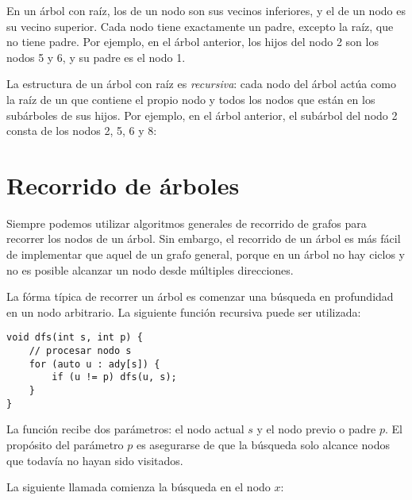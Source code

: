 En un árbol con raíz, los  de un nodo
son sus vecinos inferiores, y el  de un nodo
es su vecino superior.
Cada nodo tiene exactamente un padre,
excepto la raíz, que no tiene padre.
Por ejemplo, en el árbol anterior,
los hijos del nodo 2 son los nodos 5 y 6,
y su padre es el nodo 1.


La estructura de un árbol con raíz es \emph{recursiva}:
cada nodo del árbol actúa como la raíz de un 
que contiene el propio nodo y todos los nodos
que están en los subárboles de sus hijos.
Por ejemplo, en el árbol anterior, el subárbol del nodo 2
consta de los nodos 2, 5, 6 y 8:
\begin{center}
\end{center}

\section{Recorrido de árboles}

Siempre podemos utilizar algoritmos generales de recorrido de grafos
para recorrer los nodos de un árbol. Sin embargo, el recorrido
de un árbol es más fácil de implementar que aquel de un grafo general,
porque en un árbol no hay ciclos y no es posible alcanzar un nodo
desde múltiples direcciones.

La fórma típica de recorrer un árbol es comenzar una búsqueda en
profundidad en un nodo arbitrario. La siguiente función recursiva
puede ser utilizada:

\begin{lstlisting}
void dfs(int s, int p) {
    // procesar nodo s
    for (auto u : ady[s]) {
        if (u != p) dfs(u, s);
    }
}
\end{lstlisting}

La función recibe dos parámetros: el nodo actual $s$ y el nodo
previo o padre $p$. El propósito del parámetro $p$ es asegurarse de que
la búsqueda solo alcance nodos que todavía no hayan sido visitados.

La siguiente llamada comienza la búsqueda en el nodo $x$:

